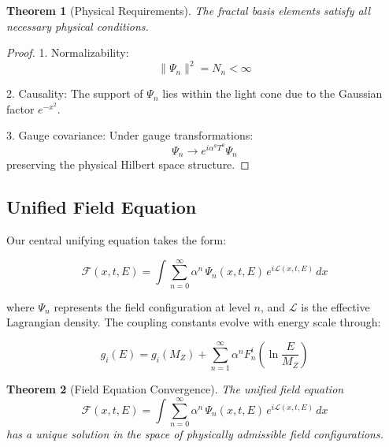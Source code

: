 \documentclass[12pt]{article}
\newtheorem{theorem}{Theorem}[section]
\begin{document}
\begin{theorem}[Physical Requirements]
The fractal basis elements satisfy all necessary physical conditions.
\end{theorem}

\begin{proof}
1. Normalizability:
   \[
   \|\Psi_n\|^2 = N_n < \infty
   \]

2. Causality:
   The support of $\Psi_n$ lies within the light cone due to the Gaussian factor $e^{-x^2}$.

3. Gauge covariance:
   Under gauge transformations:
   \[
   \Psi_n \to e^{i\alpha^a T^a}\Psi_n
   \]
   preserving the physical Hilbert space structure.
\end{proof}

\subsection{Unified Field Equation}

Our central unifying equation takes the form:

\begin{equation}
\mathcal{F}(x, t, E) = \int \sum_{n=0}^{\infty} \alpha^n \, \Psi_n(x, t, E) \, e^{i \mathcal{L}(x, t, E)} \, dx
\end{equation}

where $\Psi_n$ represents the field configuration at level $n$, and $\mathcal{L}$ is the effective Lagrangian density. The coupling constants evolve with energy scale through:

\begin{equation}
g_i(E) = g_i(M_Z) + \sum_{n=1}^{\infty} \alpha^n F_n^i\left(\ln\frac{E}{M_Z}\right)
\end{equation}

\begin{theorem}[Field Equation Convergence]
The unified field equation
\[
\mathcal{F}(x, t, E) = \int \sum_{n=0}^{\infty} \alpha^n \, \Psi_n(x, t, E) \, e^{i \mathcal{L}(x, t, E)} \, dx
\]
has a unique solution in the space of physically admissible field configurations.
\end{theorem}
\end{document}
